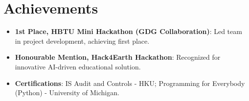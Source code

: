 \documentclass[letterpaper,11pt]{article}
\newcommand{\resumeItem}[2]{
  \item\small{
    \textbf{#1}{: #2 \vspace{-2pt}}
  }
}
\newcommand{\resumeSubHeadingListStart}{\begin{itemize}[leftmargin=*]}
\newcommand{\resumeSubHeadingListEnd}{\end{itemize}}
\begin{document}
\section{Achievements}
 \resumeSubHeadingListStart
    \resumeItem{1st Place, HBTU Mini Hackathon (GDG Collaboration)}{Led team in project development, achieving first place.}
    \resumeItem{Honourable Mention, Hack4Earth Hackathon}{Recognized for innovative AI-driven educational solution.}
    \resumeItem{Certifications}{IS Audit and Controls - HKU; Programming for Everybody (Python) - University of Michigan.}
 \resumeSubHeadingListEnd
\end{document}
